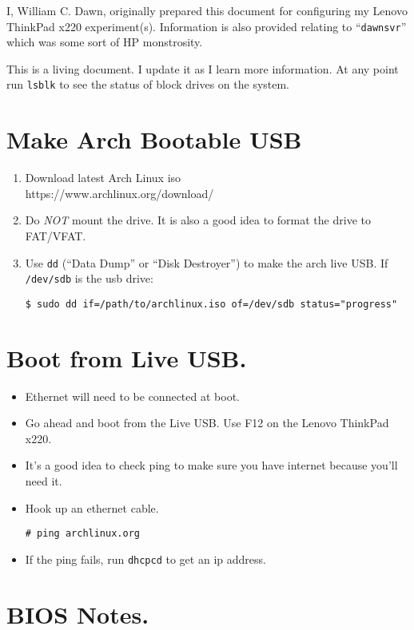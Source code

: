 \documentclass{article}
\begin{document}
I, William C. Dawn, originally prepared this document for configuring my Lenovo ThinkPad x220 experiment(s).
Information is also provided relating to ``\verb|dawnsvr|'' which was some sort of HP monstrosity.

This is a living document.
I update it as I learn more information.
At any point run \verb|lsblk| to see the status of block drives on the system.

\section{Make Arch Bootable USB}

\begin{enumerate}
  \item Download latest Arch Linux iso\\
    https://www.archlinux.org/download/
  \item Do \emph{NOT} mount the drive. It is also a good idea to format the drive to FAT/VFAT.
  \item Use \verb|dd| (``Data Dump'' or ``Disk Destroyer'') to make the arch live USB.
    If \verb|/dev/sdb| is the usb drive:
\begin{verbatim}
$ sudo dd if=/path/to/archlinux.iso of=/dev/sdb status="progress"
\end{verbatim}
\end{enumerate}

\section{Boot from Live USB.}

\begin{itemize}
  \item Ethernet will need to be connected at boot.
  \item Go ahead and boot from the Live USB. Use F12 on the Lenovo ThinkPad x220.
  \item It's a good idea to check ping to make sure you have internet because you'll need it.
  \item Hook up an ethernet cable.
\begin{verbatim}
# ping archlinux.org
\end{verbatim}
  \item If the ping fails, run \verb|dhcpcd| to get an ip address.
\end{itemize}

\section{BIOS Notes.}
\end{document}
